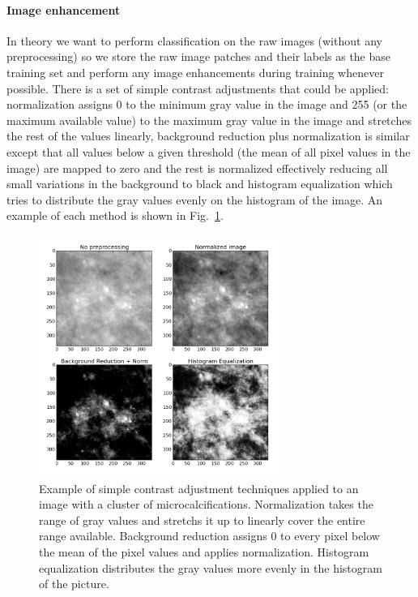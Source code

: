 \paragraph{Image enhancement}
In theory we want to perform classification on the raw images (without any preprocessing) so we store the raw image patches and their labels as the base training set and perform any image enhancements during training whenever possible. There is a set of simple contrast adjustments that could be applied: normalization assigns 0 to the minimum gray value in the image and 255 (or the maximum available value) to the maximum gray value in the image and stretches the rest of the values linearly, background reduction plus normalization is similar except that all values below a given threshold (the mean of all pixel values in the image) are mapped to zero and the rest is normalized effectively reducing all small variations in the background to black and histogram equalization which tries to distribute the gray values evenly on the histogram of the image. An example of each method is shown in Fig.~\ref{fig:PreprocessingTechniques}.
\begin{figure}[h!]
	\centering
	\includegraphics [width = 0.7\textwidth]{plots/mcDiffPreprocessings.png}
	\caption[Example of constrast adjustment techniques]{Example of simple contrast adjustment techniques applied to an image with a cluster of microcalcifications. Normalization takes the range of gray values and stretchs it up to linearly cover the entire range available. Background reduction assigns 0 to every pixel below the mean of the pixel values and applies normalization. Histogram equalization distributes the gray values more evenly in the histogram of the picture.}
	\label{fig:PreprocessingTechniques}
\end{figure}

